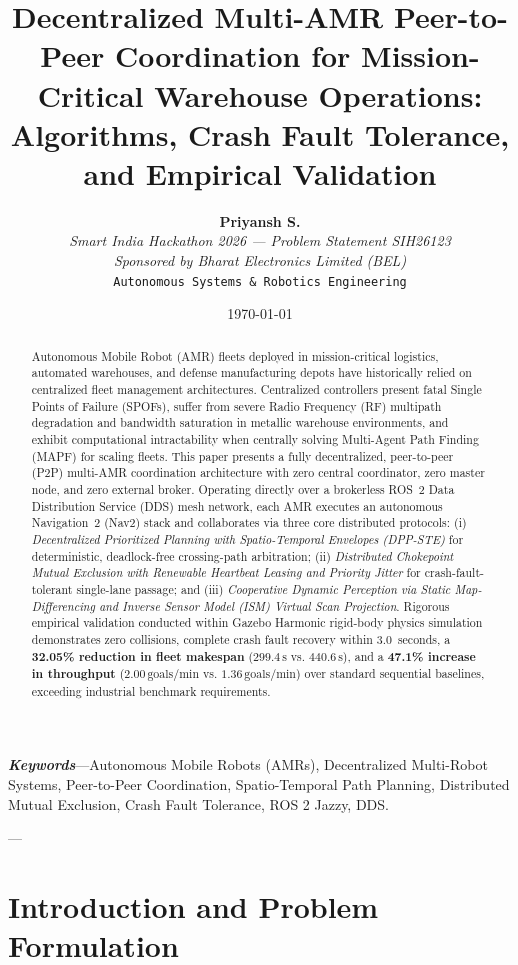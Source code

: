 \documentclass[10pt,twocolumn,a4paper]{article}
\title{\textbf{\Large Decentralized Multi-AMR Peer-to-Peer Coordination for Mission-Critical Warehouse Operations: Algorithms, Crash Fault Tolerance, and Empirical Validation}}
\author{
    \textbf{Priyansh S.} \\
    \textit{Smart India Hackathon 2026 --- Problem Statement SIH26123} \\
    \textit{Sponsored by Bharat Electronics Limited (BEL)} \\
    \texttt{Autonomous Systems \& Robotics Engineering}
}
\date{\today}
\theoremstyle{definition}
\begin{document}
\maketitle

\begin{abstract}
Autonomous Mobile Robot (AMR) fleets deployed in mission-critical logistics, automated warehouses, and defense manufacturing depots have historically relied on centralized fleet management architectures. Centralized controllers present fatal Single Points of Failure (SPOFs), suffer from severe Radio Frequency (RF) multipath degradation and bandwidth saturation in metallic warehouse environments, and exhibit computational intractability when centrally solving Multi-Agent Path Finding (MAPF) for scaling fleets. This paper presents a fully decentralized, peer-to-peer (P2P) multi-AMR coordination architecture with zero central coordinator, zero master node, and zero external broker. Operating directly over a brokerless ROS~2 Data Distribution Service (DDS) mesh network, each AMR executes an autonomous Navigation~2 (Nav2) stack and collaborates via three core distributed protocols: (i) \textit{Decentralized Prioritized Planning with Spatio-Temporal Envelopes (DPP-STE)} for deterministic, deadlock-free crossing-path arbitration; (ii) \textit{Distributed Chokepoint Mutual Exclusion with Renewable Heartbeat Leasing and Priority Jitter} for crash-fault-tolerant single-lane passage; and (iii) \textit{Cooperative Dynamic Perception via Static Map-Differencing and Inverse Sensor Model (ISM) Virtual Scan Projection}. Rigorous empirical validation conducted within Gazebo Harmonic rigid-body physics simulation demonstrates zero collisions, complete crash fault recovery within 3.0~seconds, a \textbf{32.05\% reduction in fleet makespan} ($299.4\,\text{s}$ vs. $440.6\,\text{s}$), and a \textbf{47.1\% increase in throughput} ($2.00\,\text{goals/min}$ vs. $1.36\,\text{goals/min}$) over standard sequential baselines, exceeding industrial benchmark requirements.
\end{abstract}

\textbf{\textit{Keywords}}---Autonomous Mobile Robots (AMRs), Decentralized Multi-Robot Systems, Peer-to-Peer Coordination, Spatio-Temporal Path Planning, Distributed Mutual Exclusion, Crash Fault Tolerance, ROS 2 Jazzy, DDS.

---

\section{Introduction and Problem Formulation}
\end{document}
